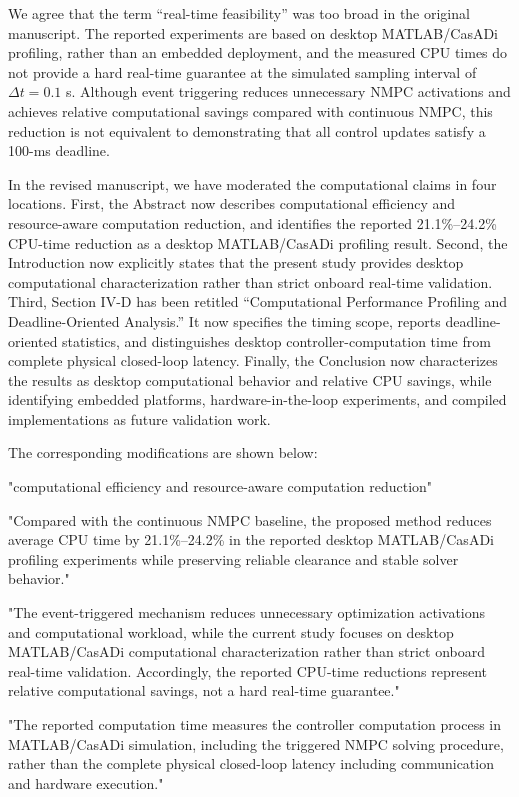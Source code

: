 \documentclass[12pt, twosides]{article}
\theoremstyle{definition}
\begin{document}
We agree that the term ``real-time feasibility'' was too broad in the original manuscript. The reported experiments are based on desktop MATLAB/CasADi profiling, rather than an embedded deployment, and the measured CPU times do not provide a hard real-time guarantee at the simulated sampling interval of $\Delta t=0.1$ s. Although event triggering reduces unnecessary NMPC activations and achieves relative computational savings compared with continuous NMPC, this reduction is not equivalent to demonstrating that all control updates satisfy a 100-ms deadline.

In the revised manuscript, we have moderated the computational claims in four locations. First, the Abstract now describes computational efficiency and resource-aware computation reduction, and identifies the reported 21.1\%--24.2\% CPU-time reduction as a desktop MATLAB/CasADi profiling result. Second, the Introduction now explicitly states that the present study provides desktop computational characterization rather than strict onboard real-time validation. Third, Section IV-D has been retitled ``Computational Performance Profiling and Deadline-Oriented Analysis.'' It now specifies the timing scope, reports deadline-oriented statistics, and distinguishes desktop controller-computation time from complete physical closed-loop latency. Finally, the Conclusion now characterizes the results as desktop computational behavior and relative CPU savings, while identifying embedded platforms, hardware-in-the-loop experiments, and compiled implementations as future validation work.

The corresponding modifications are shown below:

"computational efficiency and resource-aware computation reduction"

"Compared with the continuous NMPC baseline, the proposed method reduces average CPU time by 21.1\%--24.2\% in the reported desktop MATLAB/CasADi profiling experiments while preserving reliable clearance and stable solver behavior."

"The event-triggered mechanism reduces unnecessary optimization activations and computational workload, while the current study focuses on desktop MATLAB/CasADi computational characterization rather than strict onboard real-time validation. Accordingly, the reported CPU-time reductions represent relative computational savings, not a hard real-time guarantee."

"The reported computation time measures the controller computation process in MATLAB/CasADi simulation, including the triggered NMPC solving procedure, rather than the complete physical closed-loop latency including communication and hardware execution."
\end{document}
